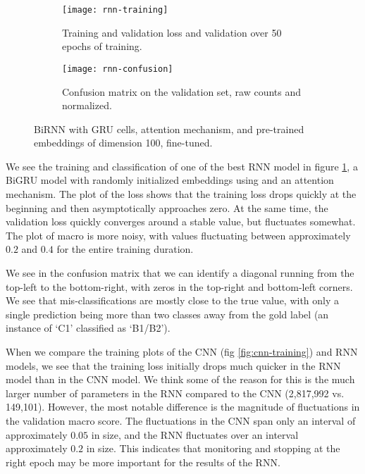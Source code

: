 \begin{figure}
  \begin{subfigure}{\linewidth}
    \centering
    \texttt{[image: rnn-training]}
    \caption{
      Training and validation loss and validation \FI over 50 epochs of
      training.
    }
  \end{subfigure}
  \begin{subfigure}{\linewidth}
    \centering
    \texttt{[image: rnn-confusion]}
    \caption{
      Confusion matrix on the validation set, raw counts and normalized.
    }
  \end{subfigure}
  \caption[Training behaviour of BiGRU with attention]{
    BiRNN with GRU cells, attention mechanism, and pre-trained
    embeddings of dimension 100, fine-tuned.
  }
  \label{fig:rnn-training}
\end{figure}

We see the training and classification of one of the best RNN model in figure
\ref{fig:rnn-training}, a BiGRU model with randomly initialized embeddings
using and an attention mechanism. The plot of the loss shows that the
training loss drops quickly at the beginning and then asymptotically
approaches zero. At the same time, the validation loss quickly converges
around a stable value, but fluctuates somewhat. The plot of macro \FI is more
noisy, with values fluctuating between approximately $0.2$ and $0.4$ for the
entire training duration.

We see in the confusion matrix that we can identify a diagonal running from
the top-left to the bottom-right, with zeros in the top-right and bottom-left
corners. We see that mis-classifications are mostly close to the true value,
with only a single prediction being more than two classes away from the gold
label (an instance of `C1' classified as `B1/B2').

When we compare the training plots of the CNN (fig \ref{fig:cnn-training})
and RNN models, we see that the training loss initially drops much quicker in
the RNN model than in the CNN model. We think some of the reason for this is
the much larger number of parameters in the RNN compared to the CNN
(2,817,992 vs. 149,101). However, the most notable difference is the
magnitude of fluctuations in the validation macro \FI score. The fluctuations
in the CNN span only an interval of approximately $0.05$ in size, and the RNN
fluctuates over an interval approximately $0.2$ in size. This indicates that
monitoring \FI and stopping at the right epoch may be more important for the
results of the RNN.


